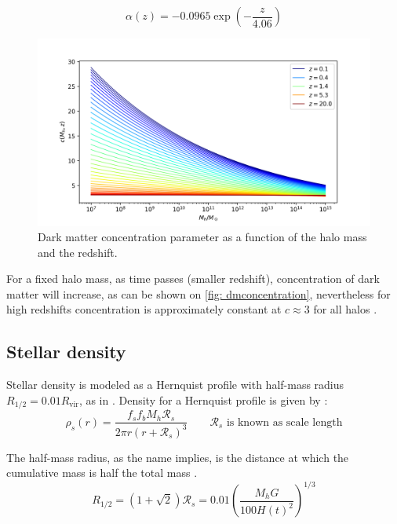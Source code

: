 			\begin{equation}
				\alpha(z) = -0.0965 \exp\left(-\dfrac{z}{4.06}\right)
			\end{equation}
			
			\begin{figure}[h]
				\centering
				\includegraphics[width=0.7\linewidth]{"../Files/Week 3/darkmatter_concentration"}
				\caption{Dark matter concentration parameter as a function of the halo mass and the redshift.}
				\label{fig: dmconcentration}
			\end{figure}
			
			For a fixed halo mass, as time passes (smaller redshift), concentration of dark matter will increase, as can be shown on \autoref{fig: dmconcentration}, nevertheless for high redshifts concentration is approximately constant at $c \approx 3$ for all halos \cite{choksi2017recoiling}.
	
		\subsection{Stellar density}
			Stellar density is modeled as a Hernquist profile with half-mass radius $R_{1/2} = 0.01 R_\text{vir}$, as in \citeauthor{choksi2017recoiling}. Density for a Hernquist profile is given by \cite{hernquist1990analytical}:
			\begin{equation}\label{eq: sdensity}
				\rho_s(r) = \dfrac{f_sf_bM_h \mathcal{R}_s}{2\pi r(r + \mathcal{R}_s)^3} \qquad \text{$\mathcal{R}_s$ is known as scale length}
			\end{equation}
			
			The half-mass radius, as the name implies, is the distance at which the cumulative mass is half the total mass \cite{hernquist1990analytical}.
			\begin{equation}
				R_{1/2} = \left(1 + \sqrt{2}\right)\mathcal{R}_s = 0.01\left({\dfrac{M_hG}{100 H(t)^2}}\right)^{1/3}
			\end{equation}
			
